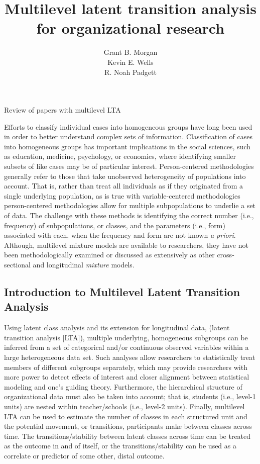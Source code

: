 \documentclass[man, noextraspace, floatsintext, 12pt]{apa7}
\title{Multilevel latent transition analysis for organizational research}
\author{Grant B. Morgan \\ Kevin E. Wells \\ R. Noah Padgett}
\affiliation{Baylor University}
\begin{document}
\maketitle

\setlength{\abovedisplayskip}{3pt}
\setlength{\belowdisplayskip}{3pt}

Review of papers with multilevel LTA 





Efforts to classify individual cases into homogeneous groups have long been used in order to better understand complex sets of information. Classification of cases into homogeneous groups has important implications in the social sciences, such as education, medicine, psychology, or economics, where identifying smaller subsets of like cases may be of particular interest.  Person-centered methodologies generally refer to those that take unobserved heterogeneity of populations into account. That is, rather than treat all individuals as if they originated from a single underlying population, as is true with variable-centered methodologies  person-centered methodologies allow for multiple subpopulations to underlie a set of data. The challenge with these methods is identifying the correct number (i.e., frequency) of subpopulations, or classes, and the parameters (i.e., form) associated with each, when the frequency and form are not known \textit{a priori}. Although, multilevel mixture models are available to researchers, they have not been methodologically examined or discussed as extensively as other cross-sectional and longitudinal \textit{mixture} models. 

\subsection*{Introduction to Multilevel Latent Transition Analysis}
Using latent class analysis and its extension for longitudinal data, (latent transition analysis [LTA]), multiple underlying, homogeneous subgroups can be inferred from a set of categorical and/or continuous observed variables within a large heterogeneous data set. Such analyses allow researchers to statistically treat members of different subgroups separately, which may provide researchers with more power to detect effects of interest and closer alignment between statistical modeling and one's guiding theory. Furthermore, the hierarchical structure of organizational data must also be taken into account; that is, students (i.e., level-1 units) are nested within teacher/schools (i.e., level-2 units). Finally, multilevel LTA can be used to estimate the number of classes in each structured unit and the potential movement, or transitions, participants make between classes across time. The transitions/stability between latent classes across time can be treated as the outcome in and of itself, or the transitions/stability can be used as a correlate or predictor of some other, distal outcome.
\end{document}
